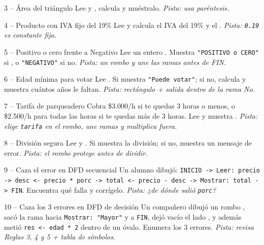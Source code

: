 \documentclass[11pt,letterpaper]{article}
\begin{document}
\begin{ejercicio}{3 -- Área del triángulo}
Lee  y , calcula  y muéstralo. \textit{Pista: usa paréntesis.}
\end{ejercicio}

\begin{ejercicio}{4 -- Producto con IVA fijo del 19\%}
Lee  y calcula el IVA del 19\% y el . \textit{Pista: \texttt{0.19} es constante fija.}
\end{ejercicio}

\begin{ejercicio}{5 -- Positivo o cero frente a Negativo}
Lee un entero . Muestra \texttt{"POSITIVO o CERO"} si , o \texttt{"NEGATIVO"} si no. \textit{Pista: un rombo y une las ramas antes de FIN.}
\end{ejercicio}

\begin{ejercicio}{6 -- Edad mínima para votar}
Lee . Si  muestra \texttt{"Puede votar"}; si no, calcula  y muestra cuántos años le faltan. \textit{Pista: rectángulo + salida dentro de la rama No.}
\end{ejercicio}

\begin{ejercicio}{7 -- Tarifa de parqueadero}
Cobra \$3.000/h si te quedas 3 horas o menos, o \$2.500/h para todas las horas si te quedas más de 3 horas. Lee  y muestra . \textit{Pista: elige \texttt{tarifa} en el rombo, une ramas y multiplica fuera.}
\end{ejercicio}

\begin{ejercicio}{8 -- División segura}
Lee  y . Si  muestra la división; si no, muestra un mensaje de error. \textit{Pista: el rombo protege antes de dividir.}
\end{ejercicio}

\begin{ejercicio}{9 -- Caza el error en DFD secuencial}
Un alumno dibujó: \texttt{INICIO -> Leer: precio -> desc <- precio * porc -> total <- precio - desc -> Mostrar: total -> FIN}. Encuentra qué falla y corrígelo. \textit{Pista: ¿de dónde salió \texttt{porc}?}
\end{ejercicio}

\begin{ejercicio}{10 -- Caza los 3 errores en DFD de decisión}
Un compañero dibujó un rombo , sacó la rama  hacia \texttt{Mostrar: "Mayor"} y a \texttt{FIN}, dejó vacío el lado , y además metió \texttt{res <- edad * 2} dentro de un óvalo. Enumera los 3 errores. \textit{Pista: revisa Reglas 3, 4 y 5 + tabla de símbolos.}
\end{ejercicio}
\end{document}
